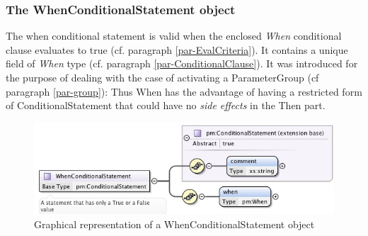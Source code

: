 \documentclass[a4paper,11pt] {ivoa}
\begin{document}
\subsubsection{The WhenConditionalStatement object}\label{par-WhenConditionalStatment}
The when conditional statement is valid when the enclosed {\it When} conditional clause
evaluates to true (cf. paragraph \ref{par-EvalCriteria}). It contains a unique field of {\it When} type (cf. paragraph \ref{par-ConditionalClause}). It was introduced for the purpose of dealing with the case of activating a ParameterGroup (cf paragraph \ref{par-group}): Thus When has the advantage of having a restricted form of ConditionalStatement that could have no {\it side effects} in the Then part.
\begin{figure}[htbp]
\begin{center}
\includegraphics[width=1.0\textwidth]{pictures/WhenConditionalStatement.jpg} 
\caption{Graphical representation of a WhenConditionalStatement object}
\label{Pic-WhenConditionalStatement}
\end{center}
\end{figure}
\end{document}

